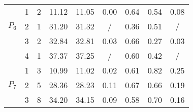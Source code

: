 \begin{tabular}{ccc|c|c|c||c|c|c||}
\multicolumn{1}{|c|}{\multirow{3}{*}{$P_6$}} & \multicolumn{1}{c|}{1} & 2
 & \multicolumn{1}{||c|}{11.12} & 11.05 & 0.00 & 0.64 & 0.54 & 0.08 \\ \cline{2-9} 
\multicolumn{1}{|c|}{} & \multicolumn{1}{c|}{2} & 1
 & \multicolumn{1}{||c|}{31.20} & 31.32 & / & 0.36 & 0.51 & / \\ \cline{2-9} 
\multicolumn{1}{|c|}{} & \multicolumn{1}{c|}{3} & 2
 & \multicolumn{1}{||c|}{32.84} & 32.81 & 0.03 & 0.66 & 0.27 & 0.03 \\ \cline{2-9} 
\multicolumn{1}{|c|}{} & \multicolumn{1}{c|}{4} & 1
 & \multicolumn{1}{||c|}{37.37} & 37.25 & / & 0.60 & 0.42 & / \\ \hline \hline

\multicolumn{1}{|c|}{\multirow{3}{*}{$P_7$}} & \multicolumn{1}{c|}{1} & 3
 & \multicolumn{1}{||c|}{10.99} & 11.02 & 0.02 & 0.61 & 0.82 & 0.25 \\ \cline{2-9} 
\multicolumn{1}{|c|}{} & \multicolumn{1}{c|}{2} & 5
 & \multicolumn{1}{||c|}{28.36} & 28.23 & 0.11 & 0.67 & 0.66 & 0.19 \\ \cline{2-9} 
\multicolumn{1}{|c|}{} & \multicolumn{1}{c|}{3} & 8
 & \multicolumn{1}{||c|}{34.20} & 34.15 & 0.09 & 0.58 & 0.70 & 0.16 \\ \hline
 
\end{tabular}